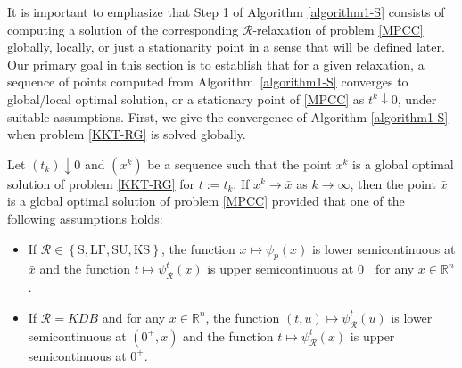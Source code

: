 It is important to emphasize that Step 1   {of Algorithm \ref{algorithm1-S}} consists of computing a solution of the corresponding $\mathcal{R}$-relaxation of problem \eqref{MPCC} globally, locally, or just a stationarity point in a sense that will be defined later. Our primary goal in this section is to establish that for a given relaxation, a sequence of   {points} computed from Algorithm~\ref{algorithm1-S} converges to global/local optimal solution, or a stationary point of \eqref{MPCC} as $t^k\downarrow 0$, under suitable assumptions.
First, we give the convergence of Algorithm \ref{algorithm1-S} when problem \eqref{KKT-RG} is solved globally. 
\begin{theorem}\label{sg}
Let $(t_{k})\downarrow0 $
	and $(x^{k})$ be a sequence such that the point $x^{k}$ is a global optimal
	solution of problem \eqref{KKT-RG} for $t:=t_k$. If $x^{k}\rightarrow\bar{x}$ as
	$k\rightarrow\infty$, then the point $\bar{x}$ is a global optimal solution of problem \eqref{MPCC} provided that one of the following assumptions holds:
 \begin{itemize}
     \item[$(a)$] If $\mathcal{R}\in \left\{\mbox{S}, \mbox{LF}, \mbox{SU}, \mbox{KS}\right\}$, the function $x \mapsto \psi_{p}(x)$ is lower semicontinuous at $\bar{x}$ and the function $t\mapsto\psi_{\mathcal{R}}^{t}(x)$ is upper
	semicontinuous at $0^+$ for any $x\in \mathbb{R}^n$.  
 \item[$(b)$] If $\mathcal{R}=KDB$ and for any $x\in \mathbb{R}^n$, the function $(t,u)\mapsto\psi_{\mathcal{R}}^{t}(u)$ is lower semicontinuous at  $(0^+,x) $ and the function $t\mapsto\psi_{\mathcal{R}}^{t}(x)$ is upper semicontinuous at $0^+$. 
 \end{itemize}
\end{theorem}

